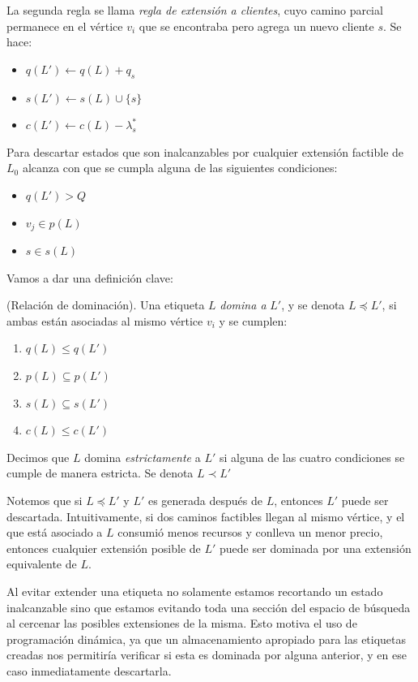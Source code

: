 La segunda regla se llama \emph{regla de extensión a clientes}, cuyo camino parcial permanece en el vértice $v_i$ que se encontraba pero agrega un nuevo cliente $s$. Se hace:

\begin{itemize}
    \item $q(L') \gets q(L) + q_ s$
    \item $s(L') \gets s(L) \cup \{s\}$
    \item $c(L') \gets c(L) - \lambda^{*}_s$
\end{itemize}

Para descartar estados que son inalcanzables por cualquier extensión factible de $L_0$ alcanza con que se cumpla alguna de las siguientes condiciones:

\begin{itemize}
    \item $q(L') > Q$
    \item $v_j \in p(L)$
    \item $s \in s(L)$
\end{itemize}

Vamos a dar una definición clave:

\begin{definition}
\label{def:domination}
    (Relación de dominación).
    Una etiqueta $L$ \emph{domina a} $L'$, y se denota $L \preceq L'$, si ambas están asociadas al mismo vértice $v_i$ y se cumplen:
    \begin{enumerate}
        \item $q(L) \leq q(L')$
        \item $p(L) \subseteq p(L')$
        \item $s(L) \subseteq s(L')$
        \item $c(L) \leq c(L')$
    \end{enumerate}

Decimos que $L$ domina \emph{estrictamente} a $L'$ si alguna de las cuatro condiciones se cumple de manera estricta. Se denota $L \prec L'$
\end{definition}

Notemos que si $L \preceq L'$ y $L'$ es generada después de $L$, entonces $L'$ puede ser descartada. Intuitivamente, si dos caminos factibles llegan al mismo vértice, y el que está asociado a $L$ consumió menos recursos y conlleva un menor precio, entonces cualquier extensión posible de $L'$ puede ser dominada por una extensión equivalente de $L$. 

Al evitar extender una etiqueta no solamente estamos recortando un estado inalcanzable sino que estamos evitando toda una sección del espacio de búsqueda al cercenar las posibles extensiones de la misma. Esto motiva el uso de programación dinámica, ya que un almacenamiento apropiado para las etiquetas creadas nos permitiría verificar si esta es dominada por alguna anterior, y en ese caso inmediatamente descartarla.    

